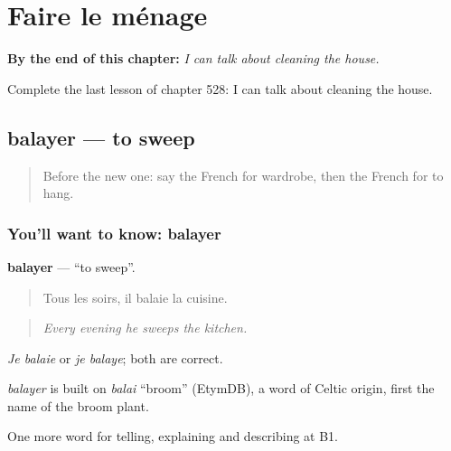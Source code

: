 
\chapter{Faire le ménage}
\label{ch:fr-faire-le-menage}

\begin{chapteropening}
\textbf{By the end of this chapter:} \emph{I can talk about cleaning the house.}

Complete the last lesson of chapter 528: I can talk about cleaning the house.
\end{chapteropening}

\section[balayer]{balayer — to sweep}

\label{lesson:FR-C528-balayer}



\begin{quote}
Before the new one: say the French for wardrobe, then the French for to hang.
\end{quote}

\subsection*{You'll want to know: balayer}
\textbf{balayer} — \textquotedblleft{}to sweep\textquotedblright{}.

\begin{quote}
Tous les soirs, il balaie la cuisine.
\end{quote}

\begin{quote}
\emph{Every evening he sweeps the kitchen.}
\end{quote}

\emph{Je balaie} or \emph{je balaye}; both are correct.

\begin{cousinweb}
\emph{balayer} is built on \emph{balai} \textquotedblleft{}broom\textquotedblright{} (EtymDB), a word of Celtic origin, first the name of the broom plant.
\end{cousinweb}

\begin{grammarlens}[title={What you've built}]
One more word for telling, explaining and describing at B1.
\end{grammarlens}

